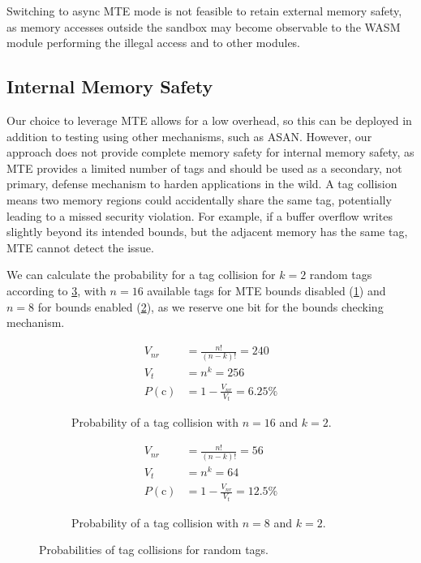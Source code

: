 Switching to async \ac{MTE} mode is not feasible to retain external memory safety, as memory accesses outside the sandbox may become observable to the \ac{WASM} module performing the illegal access and to other modules.

\subsection{Internal Memory Safety}
\label{subsec:sec-guarantees-internal-memory-safety}

Our choice to leverage \ac{MTE} allows for a low overhead, so this can be deployed in addition to testing using other mechanisms, such as \ac{ASAN}.
However, our approach does not provide complete memory safety for internal memory safety, as \ac{MTE} provides a limited number of tags and should be used as a secondary, not primary, defense mechanism to harden applications in the wild.
A tag collision means two memory regions could accidentally share the same tag, potentially leading to a missed security violation.
For example, if a buffer overflow writes slightly beyond its intended bounds, but the adjacent memory has the same tag, \ac{MTE} cannot detect the issue.

We can calculate the probability for a tag collision for $k=2$ random tags according to \cref{fig:tag-collision}, with $n=16$ available tags for \ac{MTE} bounds disabled (\cref{fig:tag-collision-16}) and $n=8$ for bounds enabled (\cref{fig:tag-collision-8}), as we reserve one bit for the bounds checking mechanism.

\begin{figure}[h]
    \centering
    \begin{subfigure}[T]{0.45\textwidth}
        \centering
        \begin{align*}
            V_{nr} &= \frac{n!}{(n - k)!} = 240 \\
            V_t &= n^k = 256 \\
            P(\text{c}) &= 1 - \frac{V_{nr}}{V_t} = 6.25\%
        \end{align*}
        \caption{Probability of a tag collision with $n=16$ and $k=2$.}
        \label{fig:tag-collision-16}
    \end{subfigure}
    \hfill
    \begin{subfigure}[T]{0.45\textwidth}
        \centering
        \begin{align*}
            V_{nr} &= \frac{n!}{(n - k)!} = 56 \\
            V_t &= n^k = 64 \\
            P(\text{c}) &= 1 - \frac{V_{nr}}{V_t} = 12.5\%
        \end{align*}
        \caption{Probability of a tag collision with $n=8$ and $k=2$.}
        \label{fig:tag-collision-8}
    \end{subfigure}
    \caption{Probabilities of tag collisions for random tags.}
    \label{fig:tag-collision}
\end{figure}

